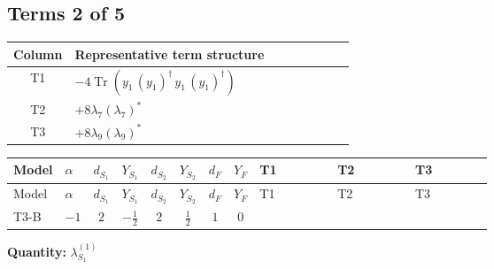 \documentclass[8pt]{article}
\begin{document}
\begin{landscape}
\subsection*{Terms 2 of 5}
\begin{center}
\begin{tabular}{@{}c >{\raggedright\arraybackslash}p{0.82\linewidth}@{}}
\toprule
Column & Representative term structure \\
\midrule
T1 & \(\displaystyle -4 \operatorname{Tr}\!\left({y_1}\,\left({y_1}\right)^{\dagger}\,{y_1}\,\left({y_1}\right)^{\dagger}\right)\) \\
\midrule
T2 & \(\displaystyle +8 {\lambda_{7}} \left({\lambda_{7}}\right)^{*}\) \\
\midrule
T3 & \(\displaystyle +8 {\lambda_{9}} \left({\lambda_{9}}\right)^{*}\) \\
\midrule
\bottomrule
\end{tabular}
\end{center}
\smallskip
\tiny
\begin{longtable}{@{}llcccccc >{\raggedright\arraybackslash}p{0.21\linewidth} >{\raggedright\arraybackslash}p{0.21\linewidth} >{\raggedright\arraybackslash}p{0.21\linewidth}@{}}
\toprule
Model & $\alpha$ & $d_{S_1}$ & $Y_{S_1}$ & $d_{S_2}$ & $Y_{S_2}$ & $d_F$ & $Y_F$ & T1 & T2 & T3 \\
\midrule
\endfirsthead
\toprule
Model & $\alpha$ & $d_{S_1}$ & $Y_{S_1}$ & $d_{S_2}$ & $Y_{S_2}$ & $d_F$ & $Y_F$ & T1 & T2 & T3 \\
\midrule
\endhead
T3-B & $-1$ & $2$ & $-\frac{1}{2}$ & $2$ & $\frac{1}{2}$ & $1$ & $0$ & \scriptsize\adjustbox{max width=\linewidth}{$\begin{gathered} -4 \operatorname{Tr}\!\left({y_1}\,\left({y_1}\right)^{\dagger}\,{y_1}\,\left({y_1}\right)^{\dagger}\right)\end{gathered}$} & \scriptsize\adjustbox{max width=\linewidth}{$\begin{gathered} +8 {\lambda_{7}} \left({\lambda_{7}}\right)^{*}\end{gathered}$} & \scriptsize\adjustbox{max width=\linewidth}{$\begin{gathered} +8 {\lambda_{9}} \left({\lambda_{9}}\right)^{*}\end{gathered}$} \\
\midrule
\bottomrule
\end{longtable}
\clearpage
\noindent\textbf{Quantity: }$\lambda_{S_1}^{(1)}$\par\smallskip

\end{landscape}
\end{document}
